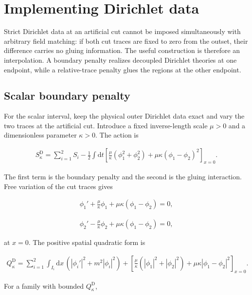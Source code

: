 \section{Implementing Dirichlet data}\label{app:dirichlet}

Strict Dirichlet data at an artificial cut cannot be imposed simultaneously with arbitrary field matching: if both cut traces are fixed to zero from the outset, their difference carries no gluing information. The useful construction is therefore an interpolation. A boundary penalty realizes decoupled Dirichlet theories at one endpoint, while a relative-trace penalty glues the regions at the other endpoint.

\subsection{Scalar boundary penalty}\label{subsec:dirichlet-scalar}

For the scalar interval, keep the physical outer Dirichlet data exact and vary the two traces at the artificial cut. Introduce a fixed inverse-length scale $\mu>0$ and a dimensionless parameter $\kappa>0$. The action is

\begin{align}
S_\kappa^{\mathrm D}
=\sum_{i=1}^2 S_i
-\frac12\int\mathrm dt\left[
\frac\mu\kappa(\phi_1^2+\phi_2^2)
+\mu\kappa(\phi_1-\phi_2)^2
\right]_{x=0}.
\end{align}

The first term is the boundary penalty and the second is the gluing interaction. Free variation of the cut traces gives

\begin{align}
\phi_1'
+\frac\mu\kappa\phi_1
+\mu\kappa(\phi_1-\phi_2)=0,
\end{align}

\begin{align}
\phi_2'
-\frac\mu\kappa\phi_2
+\mu\kappa(\phi_1-\phi_2)=0,
\end{align}

at $x=0$. The positive spatial quadratic form is

\begin{align}
Q_\kappa^{\mathrm D}
=\sum_{i=1}^2\int_{I_i}\mathrm dx\,
(|\phi_i'|^2+m^2|\phi_i|^2)
+\left[
\frac\mu\kappa(|\phi_1|^2+|\phi_2|^2)
+\mu\kappa|\phi_1-\phi_2|^2
\right]_{x=0}.
\end{align}

For a family with bounded $Q_\kappa^{\mathrm D}$,

